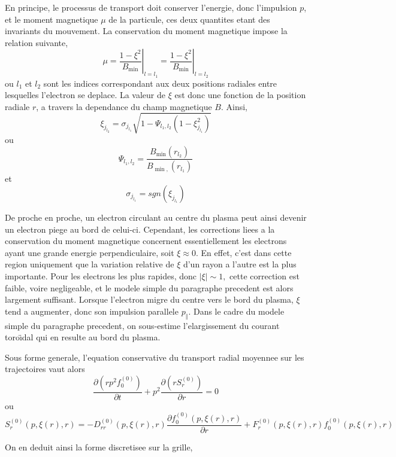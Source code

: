 En principe, le processus de transport doit conserver l'energie, donc
l'impulsion $p$, et le moment magnetique $\mu$ de la particule,
ces deux quantites etant des invariants du mouvement. La conservation
du moment magnetique impose la relation suivante, \[
\mu=\left.\frac{1-\xi^{2}}{B_{\min}}\right|_{l=l_{1}}=\left.\frac{1-\xi^{2}}{B_{\min}}\right|_{l=l_{2}}\]
 ou $l_{1}$ et $l_{2}$ sont les indices correspondant aux deux positions
radiales entre lesquelles l'electron se deplace. La valeur de $\xi$
est donc une fonction de la position radiale $r$, a travers la dependance
du champ magnetique $B$. Ainsi, \[
\xi_{j_{l_{2}}}=\sigma_{j_{l_{1}}}\sqrt{1-\Psi_{l_{1},l_{2}}\left(1-\xi_{j_{l_{1}}}^{2}\right)}\]
 ou \[
\Psi_{l_{1},l_{2}}=\frac{B_{\min}\left(r_{l_{2}}\right)}{B_{\min,}\left(r_{l_{1}}\right)}\]
 et \[
\sigma_{j_{l_{1}}}=sgn\left(\xi_{j_{l_{1}}}\right)\]


De proche en proche, un electron circulant au centre du plasma peut
ainsi devenir un electron piege au bord de celui-ci. Cependant, les
corrections liees a la conservation du moment magnetique concernent
essentiellement les electrons ayant une grande energie perpendiculaire,
soit $\xi\approx0.$ En effet, c'est dans cette region uniquement
que la variation relative de $\xi$ d'un rayon a l'autre est la plus
importante. Pour les electrons les plus rapides, donc $\left|\xi\right|\sim1,$
cette correction est faible, voire negligeable, et le modele simple
du paragraphe precedent est alors largement suffisant. Lorsque l'electron
migre du centre vers le bord du plasma, $\xi$ tend a augmenter, donc
son impulsion parallele $p_{\Vert}.$ Dans le cadre du modele simple
du paragraphe precedent, on sous-estime l'elargissement du courant
toro\"{\i}dal qui en resulte au bord du plasma.

Sous forme generale, l'equation conservative du transport radial moyennee
sur les trajectoires vaut alors \[
\frac{\partial\left(rp^{2}f_{0}^{\left(0\right)}\right)}{\partial t}+p^{2}\frac{\partial\left(rS_{r}^{\left(0\right)}\right)}{\partial r}=0\]
 ou \[
S_{r}^{\left(0\right)}\left(p,\xi\left(r\right),r\right)=-D_{rr}^{\left(0\right)}\left(p,\xi\left(r\right),r\right)\frac{\partial f_{0}^{\left(0\right)}\left(p,\xi\left(r\right),r\right)}{\partial r}+F_{r}^{\left(0\right)}\left(p,\xi\left(r\right),r\right)f_{0}^{\left(0\right)}\left(p,\xi\left(r\right),r\right)\]


On en deduit ainsi la forme discretisee sur la grille,

